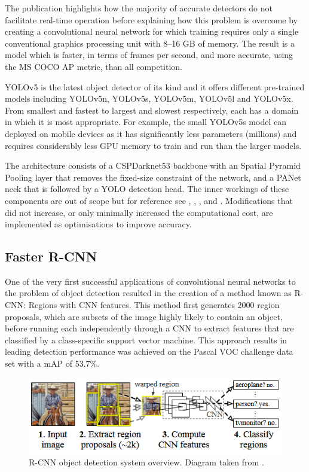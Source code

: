 \documentclass{thesis}
\begin{document}
The publication highlights how the majority of accurate detectors do not facilitate real-time operation before explaining how this problem is overcome by creating a convolutional neural network for which training requires only a single conventional graphics processing unit with 8--16 GB of memory. The result is a model which is faster, in terms of frames per second, and more accurate, using the MS COCO AP metric, than all competition.

YOLOv5 is the latest object detector of its kind and it offers different pre-trained models including YOLOv5n, YOLOv5s, YOLOv5m, YOLOv5l and YOLOv5x. From smallest and fastest to largest and slowest respectively, each has a domain in which it is most appropriate. For example, the small YOLOv5s model can deployed on mobile devices as it has significantly less parameters (millions) and requires considerably less GPU memory to train and run than the larger models\cite{yolov5}.

The architecture consists of a CSPDarknet53 backbone with an Spatial Pyramid Pooling layer that removes the fixed-size constraint of the network, and a PANet neck that is followed by a YOLO detection head\cite{yolov1}. The inner workings of these components are out of scope but for reference see \cite{yolov5}, \cite{cspnet}, \cite{spp}, and \cite{panet}. Modifications that did not increase, or only minimally increased the computational cost, are implemented as optimisations to improve accuracy\cite{yolov4}.

\subsection{Faster R-CNN}

One of the very first successful applications of convolutional neural networks to the problem of object detection resulted in the creation of a method known as R-CNN: Regions with CNN features\cite{rcnn}. This method first generates 2000 region proposals, which are subsets of the image highly likely to contain an object, before running each independently through a CNN to extract features that are classified by a class-specific support vector machine. This approach results in leading detection performance was achieved on the Pascal VOC challenge data set with a mAP of 53.7\%.

\begin{figure}[h]
    \centering
    \includegraphics[scale=0.75]{images/rcnn.png}
    \caption{R-CNN object detection system overview. Diagram taken from \cite{rcnn}.}
    \label{fig:faster-rcnn-architecture}
\end{figure}
\end{document}
